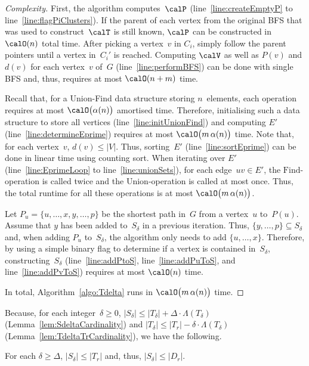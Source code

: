 \begin{proof}
    [Complexity]
First, the algorithm computes~$\calP$ (line~\ref{line:createEmptyP} to line~\ref{line:flagPiClusters}).
If the parent of each vertex from the original BFS that was used to construct~$\calT$ is still known, $\calP$ can be constructed in $\calO(n)$ total time.
After picking a vertex~$v$ in $C_i$, simply follow the parent pointers until a vertex in~$C_i'$ is reached.
Computing $\calV$ as well as $P(v)$ and $d(v)$ for each vertex~$v$ of~$G$ (line~\ref{line:performBFS}) can be done with single BFS and, thus, requires at most $\calO(n + m)$ time.

Recall that, for a Union-Find data structure storing $n$~elements, each operation requires at most $\calO \big( \alpha(n) \big)$ amortised time.
Therefore, initialising such a data structure to store all vertices (line~\ref{line:initUnionFind}) and computing $E'$ (line~\ref{line:determineEprime}) requires at most $\calO \big( m \, \alpha(n) \big)$ time.
Note that, for each vertex~$v$, $d(v) \leq |V|$.
Thus, sorting~$E'$ (line~\ref{line:sortEprime}) can be done in linear time using counting sort.
When iterating over $E'$ (line~\ref{line:EprimeLoop} to line~\ref{line:unionSets}), for each edge~$uv \in E'$, the $\mathrm{Find}$-operation is called twice and the $\mathrm{Union}$-operation is called at most once.
Thus, the total runtime for all these operations is at most $\calO \big( m \, \alpha(n) \big)$.

Let $P_u = \{ u, \ldots, x, y, \ldots, p \}$ be the shortest path in~$G$ from a vertex~$u$ to~$P(u)$.
Assume that $y$ has been added to~$S_\delta$ in a previous iteration.
Thus, $\{ y, \ldots, p \} \subseteq S_\delta$ and, when adding $P_u$ to~$S_\delta$, the algorithm only needs to add $\{ u, \ldots, x \}$.
Therefore, by using a simple binary flag to determine if a vertex is contained in~$S_\delta$, constructing~$S_\delta$ (line~\ref{line:addPtoS}, line~\ref{line:addPuToS}, and line~\ref{line:addPvToS}) requires at most $\calO(n)$ time.

In total, Algorithm~\ref{algo:Tdelta} runs in $\calO \big( m \, \alpha(n) \big)$ time.
\end{proof}


Because, for each integer~$\delta \geq 0$, $|S_\delta| \leq |T_\delta| + \Delta \cdot \Lambda(T_\delta)$ (Lemma~\ref{lem:SdeltaCardinality}) and $|T_{\delta}| \leq |T_r| - \delta \cdot \Lambda(T_\delta)$ (Lemma~\ref{lem:TdeltaTrCardinality}), we have the following.

\begin{corollary}
    \label{cor:SdeltaCardinality}
For each \( \delta \geq \Delta \), \( |S_\delta| \leq |T_r| \) and, thus, \( |S_\delta| \leq |D_r| \).
\end{corollary}

